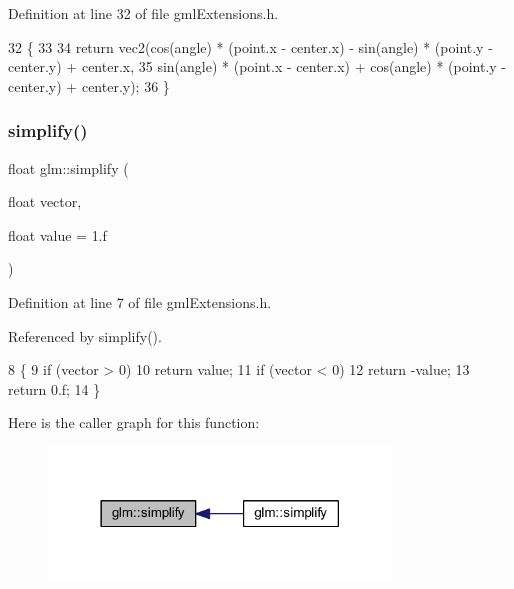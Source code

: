 Definition at line 32 of file gml\+Extensions.\+h.


\begin{DoxyCode}
32                                                                    \{
33 
34         \textcolor{keywordflow}{return} vec2(cos(angle) * (point.x - center.x) - sin(angle) * (point.y - center.y) + center.x,
35                     sin(angle) * (point.x - center.x) + cos(angle) * (point.y - center.y) + center.y);
36     \}
\end{DoxyCode}
\mbox{\label{namespaceglm_a877b2ed5ef3e542d953a0768f9494f2b}} 
\subsubsection{\texorpdfstring{simplify()}{simplify()}\hspace{0.1cm}{\footnotesize\ttfamily [1/3]}}
{\footnotesize\ttfamily float glm\+::simplify (\begin{DoxyParamCaption}\item[{float}]{vector,  }\item[{float}]{value = {\ttfamily 1.f} }\end{DoxyParamCaption})\hspace{0.3cm}{\ttfamily [inline]}}



Definition at line 7 of file gml\+Extensions.\+h.



Referenced by simplify().


\begin{DoxyCode}
8     \{
9         \textcolor{keywordflow}{if} (vector > 0)
10             \textcolor{keywordflow}{return} value;
11         \textcolor{keywordflow}{if} (vector < 0)
12             \textcolor{keywordflow}{return} -value;
13         \textcolor{keywordflow}{return} 0.f;
14     \}
\end{DoxyCode}
Here is the caller graph for this function\+:
\nopagebreak
\begin{figure}[H]
\begin{center}
\leavevmode
\includegraphics[width=258pt]{namespaceglm_a877b2ed5ef3e542d953a0768f9494f2b_icgraph}
\end{center}
\end{figure}
\mbox{\label{namespaceglm_a1b1223920ce15b9bc024049ebc24ac25}} 
